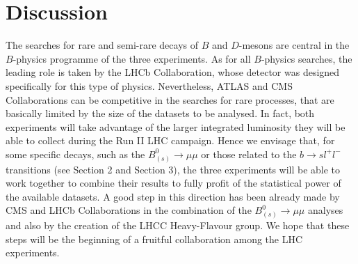 %
%
%
%
%
%
%
%
%
\section{Discussion}
The searches for rare and semi-rare decays of $B$ and $D$-mesons are central in the $B$-physics programme of the three experiments. As for all $B$-physics searches, the leading role is taken by the LHCb Collaboration, whose detector was designed specifically for this type of physics. Nevertheless, ATLAS and CMS Collaborations can be competitive in the searches for rare processes, that are basically limited by the size of the datasets to be analysed. In fact, both experiments will take advantage of the larger integrated luminosity they will be able to collect during the Run II LHC campaign. Hence we envisage that, for some specific decays, such as the $B_{(s)}^0 \to \mu \mu$ or those related to the $b \to s l^+ l^-$ transitions (see Section 2 and Section 3), the three experiments will be able to work together to combine their results to fully profit of the statistical power of the available datasets. A good step in this direction has been already made by CMS and LHCb Collaborations in the combination of the $B_{(s)}^0 \to \mu \mu$ analyses and also by the creation of the LHCC Heavy-Flavour group. We hope that these steps will be the beginning of a fruitful collaboration among the LHC experiments.
%